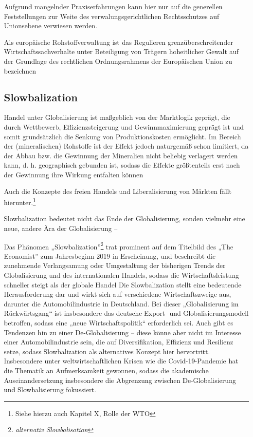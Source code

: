 \documentclass[12pt,a4paper,oneside]{book} %
\begin{document}
	Aufgrund mangelnder Praxiserfahrungen kann hier nur auf die generellen Feststellungen zur Weite des verwalungsgerichtlichen Rechtsschutzes auf Unionsebene verwiesen werden.
	
	
	\glqq Als europäische Rohstoffverwaltung ist das Regulieren grenzüberschreitender Wirtschaftssachverhalte unter Beteiligung von Trägern hoheitlicher Gewalt auf der Grundlage des rechtlichen Ordnungsrahmens der Europäischen Union zu bezeichnen\grqq \autocite{Schorkopf, Europäische Rohstoffverwaltung, Rn. 2}
	
	\subsection{Slowbalization}
	Handel unter Globalisierung ist maßgeblich von der Marktlogik geprägt, die durch Wettbewerb, Effizienzsteigerung und Gewinnmaximierung geprägt ist und somit grundsätzlich die Senkung von Produktionskosten ermöglicht. Im Bereich der (mineralischen) Rohstoffe ist der Effekt jedoch naturgemäß schon limitiert, da der Abbau bzw. die Gewinnung der Mineralien nicht beliebig verlagert werden kann, d. h. geographisch gebunden ist, sodass die Effekte größtenteils erst nach der Gewinnung ihre Wirkung entfalten können 
	
	Auch die Konzepte des freien Handels und Liberalisierung von Märkten fällt hierunter.\footnote{Siehe hierzu auch Kapitel X, Rolle der WTO}
	
	Slowbalization bedeutet nicht das Ende der Globalisierung, sonden vielmehr eine neue, andere Ära der Globalisierung -- 
	
	Das Phänomen „Slowbalization”\footnote{\textit{alternativ Slowbalisation}} trat prominent auf dem Titelbild des „The Economist” zum Jahresbeginn 2019\autocite{economist_slowbalisation_2019} in Erscheinung, und beschreibt die zunehmende Verlangsamung oder Umgestaltung der bisherigen Trends der Globalisierung und des internationalen Handels, sodass die Wirtschaftsleistung schneller steigt als der globale Handel%
	Die Slowbalization stellt eine bedeutende Herausforderung dar und wirkt sich auf verschiedene Wirtschaftszweige aus, darunter die Automobilindustrie in Deutschland. Bei dieser „Globalisierung im Rückwärtsgang“ ist insbesondere das deutsche Export- und Globalisierungsmodell betroffen, sodass eine „neue Wirtschaftspolitik“ erforderlich sei.\autocite{maier_globalisierung_2019} Auch gibt es Tendenzen hin zu einer De-Globalisierung – diese könne aber nicht im Interesse einer Automobilindustrie sein, die auf Diversifikation, Effizienz und Resilienz setze,\autocite{rade_globalisierung_2022} sodass Slowbalization als alternatives Konzept hier hervortritt. Insbesondere unter weltwirtschaftlichen Krisen wie die Covid-19-Pandemie hat die Thematik an Aufmerksamkeit gewonnen, sodass die akademische Auseinandersetzung insbesondere die Abgrenzung zwischen De-Globalisierung und Slowbalisierung fokussiert.\autocites{dalla_longa_urban_2023}{inferrera_globalisation_2021}
	
\end{document}
